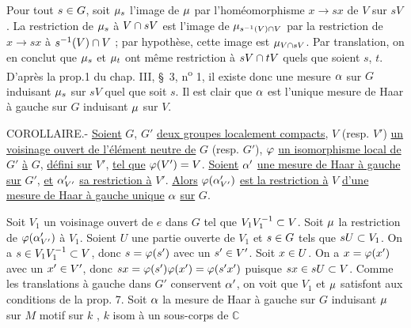 Pour tout $s\in G$, soit $\mu_s$ l'image de $\mu$ par l'homéomorphisme $x\to sx$ de $V$ sur
$sV$. La restriction de $\mu_s$ à $V\cap sV$ est l'image de $\mu_{s^{-1}(V)\cap V}$ par la restriction de
$x\to sx$ à $s^{-1}(V)\cap V$ ; par hypothèse, cette image est $\mu_{V\cap sV}$. Par
translation, on en conclut que $\mu_s$ et $\mu_t$ ont même restriction à $sV\cap tV$ quels que
soient $s$, $t$. D'après la prop.1 du chap. III, \S~3, n\textsuperscript{o} 1, il existe donc une mesure $\alpha$
sur $G$ induisant $\mu_s$ sur $sV$ quel que soit $s$. Il est clair que $\alpha$ est l'unique mesure
de Haar à gauche sur $G$ induisant $\mu$ sur $V$.

COROLLAIRE.- \uline{Soient} $G$, $G'$ \uline{deux groupes localement compacts}, $V$ (resp. $V'$) \uline{un voisinage ouvert de l'élément neutre de} $G$ (resp. $G'$), $\varphi$ \uline{un isomorphisme local de} $G'$ \uline{à} $G$,
\uline{défini sur} $V'$, \uline{tel que} $\varphi(V')=V$. \uline{Soient} $\alpha'$ \uline{une mesure de Haar à gauche sur} $G'$,
\uline{et} $\alpha'_{V'}$ \uline{sa restriction à} $V'$. \uline{Alors} $\varphi(\alpha'_{V'})$ \uline{est la restriction à} $V$ \uline{d'une mesure de
Haar à gauche unique} $\alpha$ \uline{sur} $G$.

Soit $V_1$ un voisinage ouvert de $e$ dans $G$ tel que $V_1V_1^{-1}\subset V$. Soit $\mu$ la restriction de $\varphi(\alpha'_{V'})$ à $V_1$. Soient $U$ une partie ouverte de $V_1$ et $s\in G$ tels que $sU\subset V_1$.
On a $s\in V_1V_1^{-1}\subset V$, donc $s=\varphi(s')$ avec un $s'\in V'$. Soit $x\in U$. On a $x=\varphi(x')$
avec un $x'\in V'$, donc $sx=\varphi(s')\varphi(x')=\varphi(s'x')$ puisque $sx\in sU\subset V$. Comme les
translations à gauche dans $G'$ conservent $\alpha'$, on voit que $V_1$ et $\mu$ satisfont aux
conditions de la prop. 7. Soit $\alpha$ la mesure de Haar à gauche sur $G$ induisant $\mu$ sur
$M$ motif sur $k$ , $k$ isom à un sous-corps de $\mathbb C$

